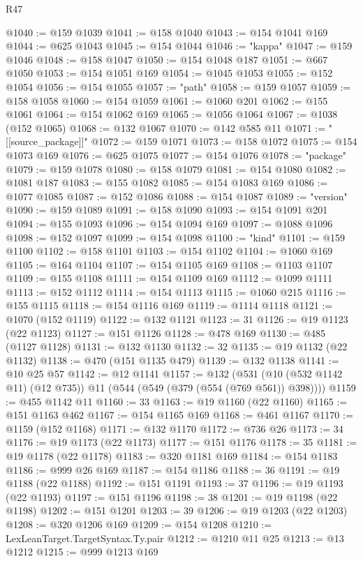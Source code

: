 \begin{lexlean}{R47}
\begin{coremodule}
@1040 := @159 @1039
@1041 := @158 @1040
@1043 := @154 @1041 @169
@1044 := @625 @1043
@1045 := @154 @1044
@1046 := "kappa"
@1047 := @159 @1046
@1048 := @158 @1047
@1050 := @154 @1048 @187
@1051 := @667 @1050
@1053 := @154 @1051 @169
@1054 := @1045 @1053
@1055 := @152 @1054
@1056 := @154 @1055
@1057 := "path"
@1058 := @159 @1057
@1059 := @158 @1058
@1060 := @154 @1059
@1061 := @1060 @201
@1062 := @155 @1061
@1064 := @154 @1062 @169
@1065 := @1056 @1064
@1067 := @1038 (@152 @1065)
@1068 := @132 @1067
@1070 := @142 @585 @11
@1071 := "[[source_package]]"
@1072 := @159 @1071
@1073 := @158 @1072
@1075 := @154 @1073 @169
@1076 := @625 @1075
@1077 := @154 @1076
@1078 := "package"
@1079 := @159 @1078
@1080 := @158 @1079
@1081 := @154 @1080
@1082 := @1081 @187
@1083 := @155 @1082
@1085 := @154 @1083 @169
@1086 := @1077 @1085
@1087 := @152 @1086
@1088 := @154 @1087
@1089 := "version"
@1090 := @159 @1089
@1091 := @158 @1090
@1093 := @154 @1091 @201
@1094 := @155 @1093
@1096 := @154 @1094 @169
@1097 := @1088 @1096
@1098 := @152 @1097
@1099 := @154 @1098
@1100 := "kind"
@1101 := @159 @1100
@1102 := @158 @1101
@1103 := @154 @1102
@1104 := @1060 @169
@1105 := @164 @1104
@1107 := @154 @1105 @169
@1108 := @1103 @1107
@1109 := @155 @1108
@1111 := @154 @1109 @169
@1112 := @1099 @1111
@1113 := @152 @1112
@1114 := @154 @1113
@1115 := @1060 @215
@1116 := @155 @1115
@1118 := @154 @1116 @169
@1119 := @1114 @1118
@1121 := @1070 (@152 @1119)
@1122 := @132 @1121
@1123 := 31
@1126 := @19 @1123 (@22 @1123)
@1127 := @151 @1126
@1128 := @478 @169
@1130 := @485 (@1127 @1128)
@1131 := @132 @1130
@1132 := 32
@1135 := @19 @1132 (@22 @1132)
@1138 := @470 (@151 @1135 @479)
@1139 := @132 @1138
@1141 := @10 @25 @57
@1142 := @12 @1141
@1157 := @132
    (@531 (@10 (@532 @1142 @11) (@12 @735)) @11 (@544 (@549 (@379 (@554 (@769 @561)) @398))))
@1159 := @455 @1142 @11
@1160 := 33
@1163 := @19 @1160 (@22 @1160)
@1165 := @151 @1163 @462
@1167 := @154 @1165 @169
@1168 := @461 @1167
@1170 := @1159 (@152 @1168)
@1171 := @132 @1170
@1172 := @736 @26
@1173 := 34
@1176 := @19 @1173 (@22 @1173)
@1177 := @151 @1176
@1178 := 35
@1181 := @19 @1178 (@22 @1178)
@1183 := @320 @1181 @169
@1184 := @154 @1183
@1186 := @999 @26 @169
@1187 := @154 @1186
@1188 := 36
@1191 := @19 @1188 (@22 @1188)
@1192 := @151 @1191
@1193 := 37
@1196 := @19 @1193 (@22 @1193)
@1197 := @151 @1196
@1198 := 38
@1201 := @19 @1198 (@22 @1198)
@1202 := @151 @1201
@1203 := 39
@1206 := @19 @1203 (@22 @1203)
@1208 := @320 @1206 @169
@1209 := @154 @1208
@1210 := LexLeanTarget.TargetSyntax.Ty.pair
@1212 := @1210 @11 @25
@1213 := @13 @1212
@1215 := @999 @1213 @169

\end{coremodule}
\end{lexlean}
